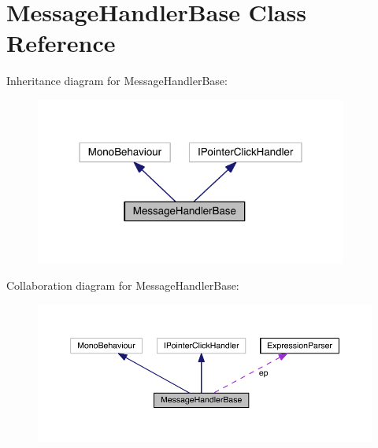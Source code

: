 \hypertarget{class_message_handler_base}{}\section{Message\+Handler\+Base Class Reference}
\label{class_message_handler_base}


Inheritance diagram for Message\+Handler\+Base\+:\nopagebreak
\begin{figure}[H]
\begin{center}
\leavevmode
\includegraphics[width=291pt]{class_message_handler_base__inherit__graph}
\end{center}
\end{figure}


Collaboration diagram for Message\+Handler\+Base\+:\nopagebreak
\begin{figure}[H]
\begin{center}
\leavevmode
\includegraphics[width=350pt]{class_message_handler_base__coll__graph}
\end{center}
\end{figure}
